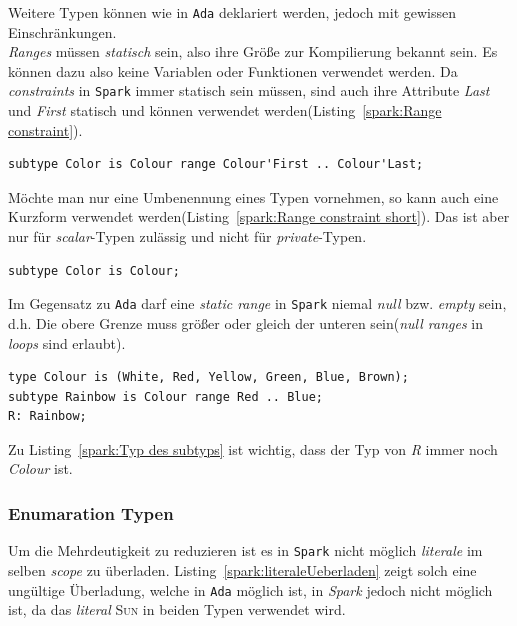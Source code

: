 Weitere Typen können wie in \texttt{Ada} deklariert werden, jedoch mit gewissen Einschränkungen.\\
\textit{Ranges} müssen \textit{statisch} sein, also ihre Größe zur Kompilierung bekannt sein. Es können dazu also keine Variablen oder Funktionen verwendet werden. Da \textit{constraints} in \texttt{Spark} immer statisch sein müssen, sind auch ihre Attribute \textit{Last} und \textit{First} statisch und können verwendet werden(Listing~\ref{spark:Range constraint}).

\begin{lstlisting}[caption={Range constraint}, label=spark:Range constraint]
subtype Color is Colour range Colour'First .. Colour'Last;
\end{lstlisting}

Möchte man nur eine Umbenennung eines Typen vornehmen, so kann auch eine Kurzform verwendet werden(Listing~\ref{spark:Range constraint short}). Das ist aber nur für \textit{scalar}-Typen zulässig und nicht für \textit{private}-Typen.

\begin{lstlisting}[caption={Range constraint kurz}, label=spark:Range constraint short]
subtype Color is Colour;
\end{lstlisting}

Im Gegensatz zu \texttt{Ada} darf eine \textit{static range} in \texttt{Spark} niemal \textit{null} bzw. \textit{empty} sein, d.h. Die obere Grenze muss größer oder gleich der unteren sein(\textit{null ranges} in \textit{loops} sind erlaubt).

\begin{lstlisting}[caption={Typ des subtyps}, label=spark:Typ des subtyps]
type Colour is (White, Red, Yellow, Green, Blue, Brown);
subtype Rainbow is Colour range Red .. Blue;
R: Rainbow;
\end{lstlisting}

Zu Listing~\ref{spark:Typ des subtyps} ist wichtig, dass der Typ von \textit{R} immer noch \textit{Colour} ist.



\subsubsection{Enumaration Typen}
\label{subsubsec:EnumarationTypen}
Um die Mehrdeutigkeit zu reduzieren ist es in \texttt{Spark} nicht möglich \textit{literale} im selben \textit{scope} zu überladen. Listing~\ref{spark:literaleUeberladen} zeigt solch eine ungültige Überladung, welche in \texttt{Ada} möglich ist, in \textit{Spark} jedoch nicht möglich ist, da das \textit{literal} \textsc{Sun} in beiden Typen verwendet wird.

